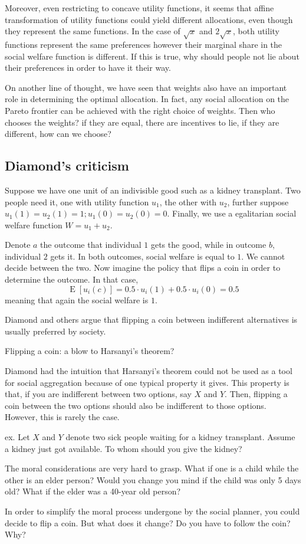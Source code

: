 \documentclass[12pt]{report}
\newcommand{\E}[1]{\operatorname{E}\left[#1\right]}
\begin{document}
Moreover, even restricting to concave utility functions, it seems that affine transformation of utility functions could yield different allocations, even though they represent the same functions. In the case of $\sqrt{x}$ and $2\sqrt{x}$, both utility functions represent the same preferences however their marginal share in the social welfare function is different. If this is true, why should people not lie about their preferences in order to have it their way.

On another line of thought, we have seen that weights also have an important role in determining the optimal allocation. In fact, any social allocation on the Pareto frontier can be achieved with the right choice of weights. Then who chooses the weights? if they are equal, there are incentives to lie, if they are different, how can we choose?

\subsection{Diamond's criticism}

Suppose we have one unit of an indivisible good such as a kidney transplant. Two people need it, one with utility function $u_1$, the other with $u_2$, further suppose $u_1(1) = u_2(1) = 1 ; u_1(0) = u_2(0) = 0$. Finally, we use a egalitarian social welfare function $W = u_1 + u_2$.

Denote $a$ the outcome that individual $1$ gets the good, while in outcome $b$, individual $2$ gets it. In both outcomes, social welfare is equal to $1$. We cannot decide between the two. Now imagine the policy that flips a coin in order to determine the outcome. In that case, $$\E{u_i(c)} = 0.5\cdot u_i(1) + 0.5\cdot u_i(0) = 0.5 $$ meaning that again the social welfare is $1$.

Diamond and others argue that flipping a coin between indifferent alternatives is usually preferred by society.

\begin{bclogo}[couleur=blue!10, arrondi=0.1, logo=,ombre=false]{ Flipping a coin: a blow to Harsanyi's theorem?} 
\begin{small}
Diamond had the intuition that Harsanyi's theorem could not be used as a tool for social aggregation because of one typical property it gives. This property is that, if you are indifferent between two options, say $X$ and $Y$. Then, flipping a coin between the two options should also be indifferent to those options. However, this is rarely the case.

ex. Let $X$ and $Y$ denote two sick people waiting for a kidney transplant. Assume a kidney just got available. To whom should you give the kidney?

The moral considerations are very hard to grasp. What if one is a child while the other is an elder person? Would you change you mind if the child was only 5 days old? What if the elder was a 40-year old person? 

In order to simplify the moral process undergone by the social planner, you could decide to flip a coin. But what does it change? Do you have to follow the coin? Why?
\end{small}
\end{bclogo}
\end{document}
